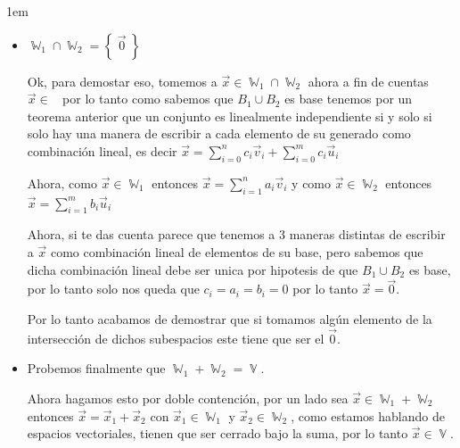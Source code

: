 \documentclass[12pt, fleqn]{report}                             %
\newenvironment{SmallIndentation}[1][0.75em]                    %
        {\begin{adjustwidth}{#1}{}\begin{footnotesize}}             %
        {\end{footnotesize}\end{adjustwidth}}                       %
\theoremstyle{break}                                            %
\DeclareMathOperator \GenericField {\mathbb{F}}                 %
\DeclareMathOperator \VectorSet    {\mathbb{V}}                 %
\DeclareMathOperator \SubVectorSet {\mathbb{W}}                 %
\DeclareMathOperator \VectorSpace  {\VectorSet_{\GenericField}} %
\newcommand{\Set}[1]            {\left\{ \; #1 \; \right\}}     %
\begin{document}
\begin{itemize}
\begin{SmallIndentation}[1em]
\begin{itemize}
                                \item
                                    $\SubVectorSet_1 \cap \SubVectorSet_2 = \Set{\vec 0}$

                                    Ok, para demostar eso, tomemos a $\vec x \in \SubVectorSet_1 \cap \SubVectorSet_2$
                                    ahora a fin de cuentas $\vec x \in \VectorSpace$ por lo tanto como sabemos que $B_1 \cup B_2$
                                    es base tenemos por un teorema anterior que un conjunto es linealmente independiente si y solo si solo hay
                                    una manera de escribir a cada elemento de su generado como combinación lineal, es
                                    decir $\vec x = \sum_{i=0}^{n} c_i \vec v_i + \sum_{i=0}^{m} c_i \vec u_i$

                                    Ahora, como $\vec x \in \SubVectorSet_1$ entonces $\vec x = \sum_{i=1}^n a_i \vec v_i$
                                    y como $\vec x \in \SubVectorSet_2$ entonces $\vec x = \sum_{i=1}^m b_i \vec u_i$

                                    Ahora, si te das cuenta parece que tenemos a 3 maneras distintas de escribir a $\vec x$ como
                                    combinación lineal de elementos de su base, pero sabemos que dicha combinación lineal debe ser unica por
                                    hipotesis de que $B_1 \cup B_2$ es base, por lo tanto solo nos queda que $c_i = a_i = b_i = 0$
                                    por lo tanto $\vec x = \vec 0$.

                                    Por lo tanto acabamos de demostrar que si tomamos algún elemento de la intersección de dichos subespacios
                                    este tiene que ser el $\vec 0$.

                                \item
                                    Probemos finalmente que $\SubVectorSet_1 + \SubVectorSet_2 = \VectorSet$.

                                    Ahora hagamos esto por doble contención, por un lado sea
                                    $\vec x \in \SubVectorSet_1 + \SubVectorSet_2$ entonces
                                    $\vec x = \vec x_1 + \vec x_2$ con $\vec x_1 \in \SubVectorSet_1$ y $\vec x_2 \in \SubVectorSet_2$,
                                    como estamos hablando de espacios vectoriales, tienen que ser cerrado bajo la suma, por lo tanto
                                    $\vec x \in \VectorSet$.


\end{itemize}
\end{SmallIndentation}
\end{itemize}
\end{document}
